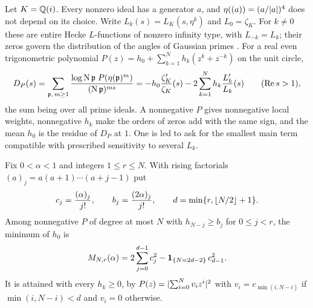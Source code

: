 Let $K=\mathbb{Q}(i)$. Every nonzero ideal has a generator $a$, and $\eta((a))=(a/\lvert a\rvert)^4$ does not depend on its
choice. Write $L_k(s)=L_K(s,\eta^k)$ and $L_0=\zeta_K$. For $k\ne0$ these are entire Hecke $L$-functions of
nonzero infinity type, with $L_{-k}=L_k$; their zeros govern the distribution of the angles of Gaussian
primes \cite{RudnickWaxman2017Angles}. For a real even trigonometric polynomial
$P(z)=h_0+\sum_{k=1}^Nh_k(z^k+z^{-k})$ on the unit circle,
\begin{equation}\label{hec:eq:DP}
 D_P(s)=\sum_{\mathfrak p,\,m\ge1}\frac{\log\operatorname{N}\mathfrak p\;P(\eta(\mathfrak p)^m)}{(\operatorname{N}\mathfrak p)^{ms}}
 =-h_0\frac{\zeta_K'}{\zeta_K}(s)-2\sum_{k=1}^Nh_k\frac{L_k'}{L_k}(s)\qquad(\operatorname{Re} s>1),
\end{equation}
the sum being over all prime ideals. A nonnegative $P$ gives nonnegative local weights, nonnegative $h_k$
make the orders of zeros add with the same sign, and the mean $h_0$ is the residue of $D_P$ at $1$. One is
led to ask for the smallest main term compatible with prescribed sensitivity to several $L_k$.

\begin{theorem}\label{hec:thm:belov}
Fix $0<\alpha<1$ and integers $1\le r\le N$. With rising factorials $(a)_j=a(a+1)\cdots(a+j-1)$ put
\[
 c_j=\frac{(\alpha)_j}{j!},\qquad b_j=\frac{(2\alpha)_j}{j!},\qquad
 d=\min\{r,\lfloor N/2\rfloor+1\}.
\]
Among nonnegative $P$ of degree at most $N$ with $h_{N-j}\ge b_j$ for $0\le j<r$, the minimum of $h_0$ is
\[
 M_{N,r}(\alpha)=2\sum_{j=0}^{d-1}c_j^2-\mathbf{1}_{\{N=2d-2\}}\,c_{d-1}^2 .
\]
It is attained with every $h_k\ge0$, by $P(z)=\lvert\sum_{i=0}^Nv_iz^i\rvert^2$ with $v_i=c_{\min(i,N-i)}$ if
$\min(i,N-i)<d$ and $v_i=0$ otherwise.
\end{theorem}

